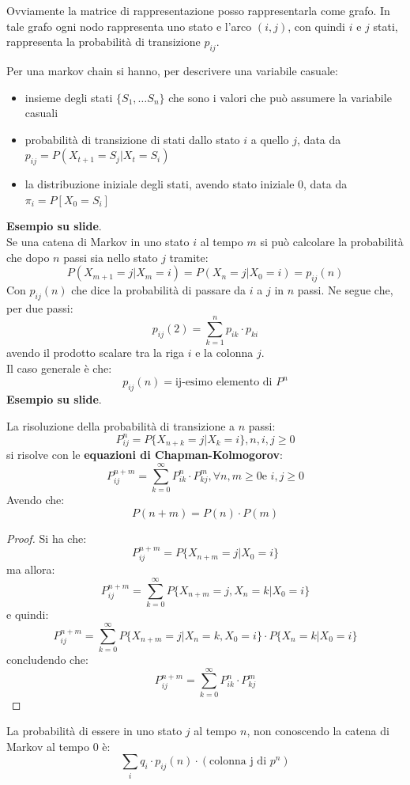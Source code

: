 \documentclass[a4paper,12pt, oneside]{book}
\begin{document}
Ovviamente la matrice di rappresentazione posso rappresentarla come grafo.
In tale grafo ogni nodo rappresenta uno
stato e l'arco $(i,j)$, con quindi $i$ e $j$ stati, rappresenta la probabilità
di transizione $p_{ij}$.
\begin{definizione}
  Per una markov chain si hanno, per descrivere una variabile casuale:
  \begin{itemize}
    \item insieme degli stati $\{S_1,\ldots S_n\}$ che sono i valori che può
    assumere la variabile casuali
    \item probabilità di transizione di stati dallo stato $i$ a quello $j$, data
    da $p_{ij}=P(X_{t+1}=S_j|X_t=S_i)$
    \item la distribuzione iniziale degli stati, avendo stato iniziale $0$, data
    da $\pi_i=P[X_0=S_i]$ 
  \end{itemize}
\end{definizione}
\textbf{Esempio su slide}.\\
Se una catena di Markov in uno stato $i$ al tempo $m$ si può calcolare la
probabilità che dopo $n$ passi sia nello stato $j$ tramite:
\[P(X_{m+1}=j|X_m=i)=P(X_n=j|X_0=i)=p_{ij}(n)\]
Con $p_{ij}(n)$ che dice la probabilità di passare da $i$ a $j$ in $n$ passi. Ne
segue che, per due passi:
\[p_{ij}(2)=\sum_{k=1}^n p_{ik}\cdot p_{ki}\]
avendo il prodotto scalare tra la riga $i$ e la colonna $j$.\\
Il caso generale è che:
\[p_{ij}(n)=\mbox{ij-esimo elemento di } P^n\]
\textbf{Esempio su slide}.\\
\begin{teorema}
  La risoluzione della probabilità di transizione a $n$ passi:
  \[P_{ij}^n=P\{X_{n+k}=j|X_k=i\},n,i,j\geq 0\]
  si risolve con le \textbf{equazioni di Chapman-Kolmogorov}:
  \[P_{ij}^{n+m}=\sum_{k=0}^\infty P_{ik}^n\cdot P_{kj}^m,\forall n,m\geq 0\mbox{
      e } i,j\geq 0\]
  Avendo che:
  \[P(n+m)=P(n)\cdot P(m)\]
\end{teorema}
\begin{proof}
  Si ha che:
  \[P_{ij}^{n+m}=P\{X_{n+m}=j|X_0=i\}\]
  ma allora:
  \[P_{ij}^{n+m}=\sum_{k=0}^\infty P\{X_{n+m}=j,X_n=k|X_0=i\}\]
  e quindi:
  \[P_{ij}^{n+m}=\sum_{k=0}^\infty P\{X_{n+m}=j|X_n=k,X_0=i\}\cdot
    P\{X_n=k|X_0=i\}\]
  concludendo che:
  \[P_{ij}^{n+m}=\sum_{k=0}^\infty P_{ik}^n\cdot P_{kj}^m\]
\end{proof}
\begin{teorema}
  La probabilità di essere in uno stato $j$ al tempo $n$, non conoscendo la
  catena di Markov al tempo 0 è:
  \[\sum_i q_i\cdot p_{ij}(n)\cdot(\mbox{colonna j di }p^n)\]
\end{teorema}
\end{document}
